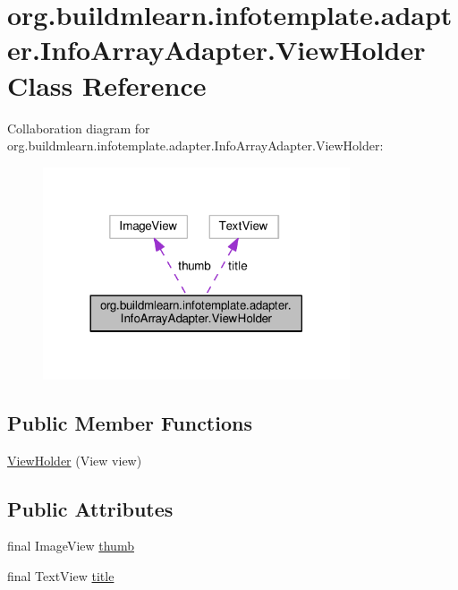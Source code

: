\hypertarget{classorg_1_1buildmlearn_1_1infotemplate_1_1adapter_1_1InfoArrayAdapter_1_1ViewHolder}{}\section{org.\+buildmlearn.\+infotemplate.\+adapter.\+Info\+Array\+Adapter.\+View\+Holder Class Reference}
\label{classorg_1_1buildmlearn_1_1infotemplate_1_1adapter_1_1InfoArrayAdapter_1_1ViewHolder}


Collaboration diagram for org.\+buildmlearn.\+infotemplate.\+adapter.\+Info\+Array\+Adapter.\+View\+Holder\+:
\nopagebreak
\begin{figure}[H]
\begin{center}
\leavevmode
\includegraphics[width=257pt]{classorg_1_1buildmlearn_1_1infotemplate_1_1adapter_1_1InfoArrayAdapter_1_1ViewHolder__coll__graph}
\end{center}
\end{figure}
\subsection*{Public Member Functions}
\begin{DoxyCompactItemize}
\item 
\hyperlink{classorg_1_1buildmlearn_1_1infotemplate_1_1adapter_1_1InfoArrayAdapter_1_1ViewHolder_ad794bbac0ad752e5990221290e9d1e85}{View\+Holder} (View view)
\end{DoxyCompactItemize}
\subsection*{Public Attributes}
\begin{DoxyCompactItemize}
\item 
final Image\+View \hyperlink{classorg_1_1buildmlearn_1_1infotemplate_1_1adapter_1_1InfoArrayAdapter_1_1ViewHolder_ad20b0f8813a4a8e15591a5799970c1c7}{thumb}
\item 
final Text\+View \hyperlink{classorg_1_1buildmlearn_1_1infotemplate_1_1adapter_1_1InfoArrayAdapter_1_1ViewHolder_aaaca68d6acae1ec5aa22f3e531369ed4}{title}
\end{DoxyCompactItemize}


